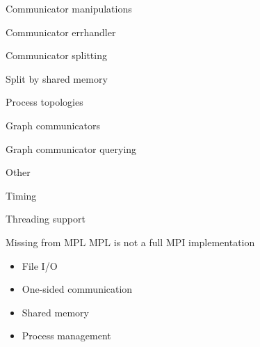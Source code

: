 \documentclass[11pt,headernav]{beamer}
\begin{document}
 {Communicator manipulations}

\begin{numberedframe}{Communicator errhandler}
  
\end{numberedframe}
\begin{numberedframe}{Communicator splitting}
  
\end{numberedframe}
\begin{numberedframe}{Split by shared memory}
  
\end{numberedframe}

 {Process topologies}

\begin{numberedframe}{Graph communicators}
  
\end{numberedframe}
\begin{numberedframe}{Graph communicator querying}
  
\end{numberedframe}

 {Other}

\begin{numberedframe}{Timing}
  
\end{numberedframe}

\begin{numberedframe}{Threading support}
  
\end{numberedframe}

\begin{frame}{Missing from MPL}
  MPL is not a full MPI implementation
  \begin{itemize}
  \item File I/O
  \item One-sided communication
  \item Shared memory
  \item Process management
  \end{itemize}
\end{frame}
\end{document}
